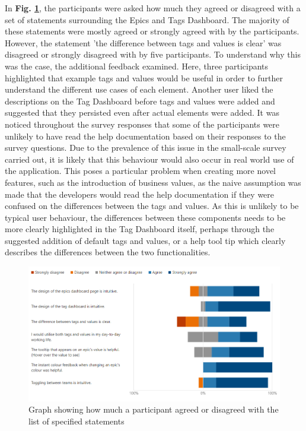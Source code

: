 \documentclass[l4proj.tex]{subfiles}
\begin{document}
In \textbf{Fig. \ref{fig:epic and tag statement feedback}}, the participants were asked how much they agreed or disagreed with a set of statements surrounding the Epics and Tags Dashboard. The majority of these statements were mostly agreed or strongly agreed with by the participants. However, the statement 'the difference between tags and values is clear' was disagreed or strongly disagreed with by five participants. To understand why this was the case, the additional feedback examined. Here, three participants highlighted that example tags and values would be useful in order to further understand the different use cases of each element. Another user liked the descriptions on the Tag Dashboard before tags and values were added and suggested that they persisted even after actual elements were added. It was noticed throughout the survey responses that some of the participants were unlikely to have read the help documentation based on their responses to the survey questions. Due to the prevalence of this issue in the small-scale survey carried out, it is likely that this behaviour would also occur in real world use of the application. This poses a particular problem when creating more novel features, such as the introduction of business values, as the naive assumption was made that the developers would read the help documentation if they were confused on the differences between the tags and values. As this is unlikely to be typical user behaviour, the differences between these components needs to be more clearly highlighted in the Tag Dashboard itself, perhaps through the suggested addition of default tags and values, or a help tool tip which clearly describes the differences between the two functionalities. 

\begin{figure}[h!]
\begin{center}
\includegraphics[scale=0.5]{dissertation/images/EvaluationEpicsAndTagsStatementGraph.png}
\caption{Graph showing how much a participant agreed or disagreed with the list of specified statements}
\label{fig:epic and tag statement feedback} 
\end{center}
\end{figure}
\end{document}
